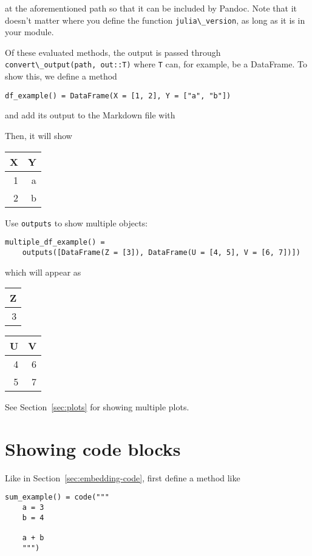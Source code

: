 \documentclass[
  14pt
  american,
  paper=a4,
  ,captions=tableheading
]{scrreprt}
\newcommand{\passthrough}[1]{#1}
\begin{document}
at the aforementioned path so that it can be included by Pandoc. Note
that it doesn't matter where you define the function
\passthrough{\lstinline!julia\_version!}, as long as it is in your
module.

Of these evaluated methods, the output is passed through
\passthrough{\lstinline!convert\_output(path, out::T)!} where
\passthrough{\lstinline!T!} can, for example, be a DataFrame. To show
this, we define a method

\begin{lstlisting}
df_example() = DataFrame(X = [1, 2], Y = ["a", "b"])
\end{lstlisting}

and add its output to the Markdown file with

Then, it will show

\begin{longtable}[]{@{}rr@{}}
\toprule
X & Y\tabularnewline
\midrule
\endhead
1 & a\tabularnewline
2 & b\tabularnewline
\bottomrule
\end{longtable}

Use \passthrough{\lstinline!outputs!} to show multiple objects:

\begin{lstlisting}
multiple_df_example() =
    outputs([DataFrame(Z = [3]), DataFrame(U = [4, 5], V = [6, 7])])
\end{lstlisting}

which will appear as

\begin{longtable}[]{@{}r@{}}
\toprule
Z\tabularnewline
\midrule
\endhead
3\tabularnewline
\bottomrule
\end{longtable}

\begin{longtable}[]{@{}rr@{}}
\toprule
U & V\tabularnewline
\midrule
\endhead
4 & 6\tabularnewline
5 & 7\tabularnewline
\bottomrule
\end{longtable}

See Section~\ref{sec:plots} for showing multiple plots.

\hypertarget{sec:code-blocks}{%
\section{Showing code blocks}\label{sec:code-blocks}}

Like in Section~\ref{sec:embedding-code}, first define a method like

\begin{lstlisting}
sum_example() = code("""
    a = 3
    b = 4

    a + b
    """)
\end{lstlisting}
\end{document}
